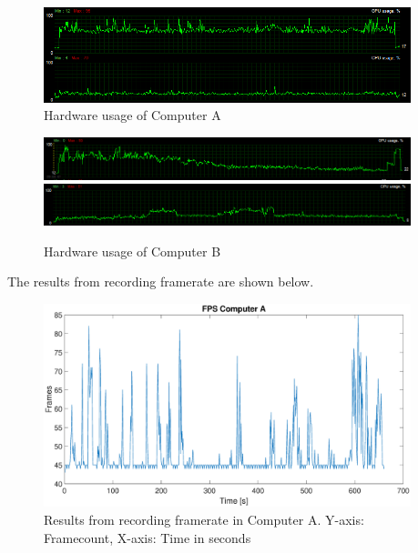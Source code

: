 \begin{figure}[H]
\centering
\includegraphics[width=0.95\textwidth]{InternalTest/B_usage.PNG}
\caption{Hardware usage of Computer A}
\end{figure}

\begin{figure}[H]
\centering
\includegraphics[width=0.95\textwidth]{InternalTest/C_gpu.PNG}
\includegraphics[width=0.95\textwidth]{InternalTest/C_cpu.PNG}
\caption{Hardware usage of Computer B}
\end{figure}

The results from recording framerate are shown below. 

\begin{figure}[H]
\centering
\includegraphics[width=0.95\textwidth]{InternalTest/A_fps.eps}
\caption{Results from recording framerate in Computer A. Y-axis: Framecount, X-axis: Time in seconds}
\end{figure}

